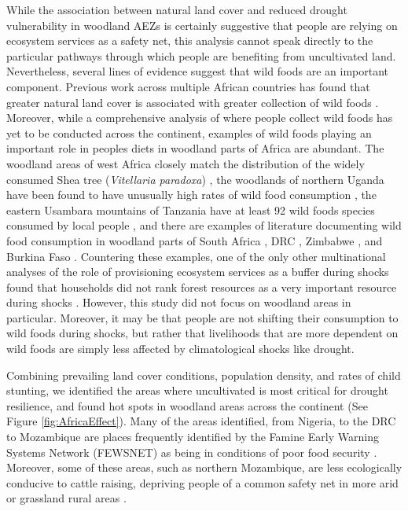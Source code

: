 \documentclass[titlepage]{article}
\begin{document}
While the association between natural land cover and reduced drought vulnerability in woodland AEZs is certainly suggestive that people are relying on ecosystem services as a safety net, this analysis cannot speak directly to the particular pathways through which people are benefiting from uncultivated land.  Nevertheless, several lines of evidence suggest that wild foods are an important component.  Previous work across multiple African countries has found that greater natural land cover is associated with greater collection of wild foods \citep{Cooper2018a}.  Moreover, while a comprehensive analysis of where people collect wild foods has yet to be conducted across the continent, examples of wild foods playing an important role in peoples diets in woodland parts of Africa are abundant.  The woodland areas of west Africa closely match the distribution of the widely consumed Shea tree (\textit{Vitellaria paradoxa}) \citep{Naughton2015, Naughton2017}, the woodlands of northern Uganda have been found to have unusually high rates of wild food consumption \citep{cooper2017vs}, the eastern Usambara mountains of Tanzania have at least 92 wild foods species consumed by local people \citep{powell2013wild}, and there are examples of literature documenting wild food consumption in woodland parts of South Africa \citep{garekae2020foraging}, DRC \citep{de2004value}, Zimbabwe \citep{zinyama1990use}, and Burkina Faso \citep{lamien2008importance}.  Countering these examples, one of the only other multinational analyses of the role of provisioning ecosystem services as a buffer during shocks found that households did not rank forest resources as a very important resource during shocks \citep{Wunder2014}. However, this study did not focus on woodland areas in particular.  Moreover, it may be that people are not shifting their consumption to wild foods during shocks, but rather that livelihoods that are more dependent on wild foods are simply less affected by climatological shocks like drought.

Combining prevailing land cover conditions, population density, and rates of child stunting, we identified the areas where uncultivated is most critical for drought resilience, and found hot spots in woodland areas across the continent (See Figure \ref{fig:AfricaEffect}).  Many of the areas identified, from Nigeria, to the DRC to Mozambique are places frequently identified by the Famine Early Warning Systems Network (FEWSNET) as being in conditions of poor food security \citep{FEWSNET2017, FEWSNET2018, FEWSNET2020}.  Moreover, some of these areas, such as northern Mozambique, are less ecologically conducive to cattle raising, depriving people of a common safety net in more arid or grassland rural areas \citep{mabiso2014food}.
\end{document}
